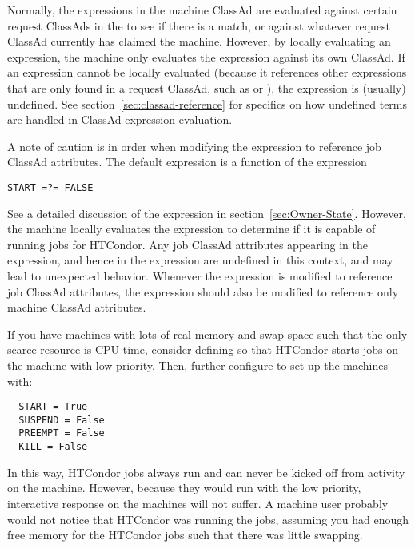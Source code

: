 Normally, the expressions in the machine ClassAd are evaluated against
certain request ClassAds in the  to see if there is
a match, or against whatever request ClassAd currently has claimed the
machine.  However, by locally evaluating an expression, the machine only
evaluates the expression against its own ClassAd.  If an expression
cannot be locally evaluated (because it references other expressions
that are only found in a request ClassAd, such as  or
), the expression is (usually) undefined.
See section~\ref{sec:classad-reference} for specifics on
how undefined terms are handled in ClassAd expression evaluation. 

A note of caution is in order when modifying the  expression to
reference job ClassAd attributes.  The default 
expression is a function of the  expression
\begin{verbatim}
START =?= FALSE
\end{verbatim}
See a detailed discussion of the  expression in
section~\ref{sec:Owner-State}.  However, the machine locally
evaluates the  expression to determine if it is
capable of running jobs for HTCondor.  Any job ClassAd attributes
appearing in the  expression, and hence in the
 expression are undefined in this context, and may
lead to unexpected behavior.  Whenever the  expression
is modified to reference job ClassAd attributes, the
 expression should also be modified to reference
only machine ClassAd attributes.

\Note If you have machines with lots of real memory and swap space such
that the only scarce resource is CPU time, consider
defining  
so that HTCondor starts jobs on the machine with low priority.
Then, further configure to set up the machines with:
\begin{verbatim}
  START = True
  SUSPEND = False
  PREEMPT = False
  KILL = False
\end{verbatim}
In this way, HTCondor jobs always run and can never be kicked off
from activity on the machine. 
However, because they would run with the low priority,
interactive response on the machines will not suffer.
A machine user probably would not notice that HTCondor was running the jobs, 
assuming you had enough free memory for the HTCondor jobs such that there
was little swapping.

